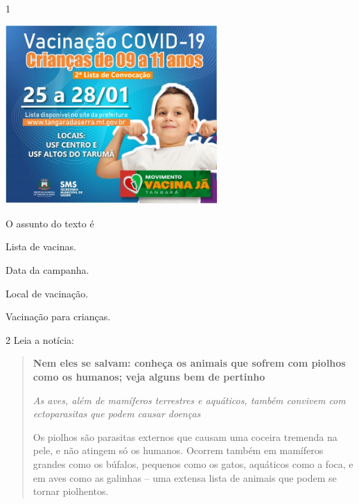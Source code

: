 
\num{1}

\includegraphics[width=3.17910in,height=2.68418in]{media/image124.jpeg}


O assunto do texto é

\begin{escolha}
\item Lista de vacinas.

\item Data da campanha.

\item Local de vacinação.

\item Vacinação para crianças.
\end{escolha}

\num{2} Leia a notícia:

\begin{quote}
\textbf{Nem eles se salvam: conheça os animais que sofrem com piolhos
como os humanos; veja alguns bem de pertinho}

\textit{As aves, além de mamíferos terrestres e aquáticos, também convivem com
ectoparasitas que podem causar doenças}

Os piolhos são parasitas externos que causam uma coceira tremenda na
pele, e não atingem só os humanos. Ocorrem também em mamíferos grandes
como os búfalos, pequenos como os gatos, aquáticos como a foca, e em
aves como as galinhas -- uma extensa lista de animais que podem se
tornar piolhentos.
\end{quote}


